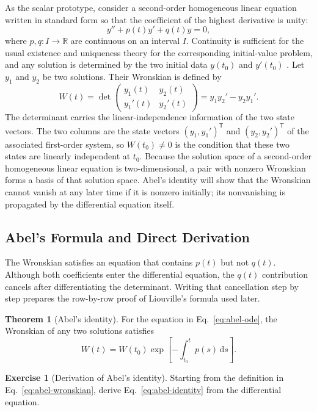 \documentclass[11pt,a4paper]{article}
\newcommand{\be}{\begin{equation}}
\newcommand{\ee}{\end{equation}}
\newcommand{\lb}[1]{\label{#1}}
\newcommand{\dd}{\mathrm{d}}
\newcommand{\R}{\mathbb{R}}
\theoremstyle{definition}
\newtheorem{theorem}{Theorem}[section]
\newtheorem{exercise}{Exercise}[section]
\numberwithin{equation}{section}
\begin{document}
As the scalar prototype, consider a second-order homogeneous linear equation written in standard form so that the coefficient of the highest derivative is unity:
\be
y''+p(t)y'+q(t)y=0,
\lb{eq:abel-ode}
\ee
where $p,q:I\rightarrow\R$ are continuous on an interval $I$. Continuity is sufficient for the usual existence and uniqueness theory for the corresponding initial-value problem, and any solution is determined by the two initial data $y(t_0)$ and $y'(t_0)$ \cite{coddington1955,teschl2012}. Let $y_1$ and $y_2$ be two solutions. Their Wronskian is defined by
\be
W(t)=
\det
\begin{pmatrix}
y_1(t) & y_2(t)\\
y_1'(t) & y_2'(t)
\end{pmatrix}
=
y_1y_2'-y_2y_1'.
\lb{eq:abel-wronskian}
\ee
The determinant carries the linear-independence information of the two state vectors. The two columns are the state vectors $(y_1,y_1')^{\mathsf T}$ and $(y_2,y_2')^{\mathsf T}$ of the associated first-order system, so $W(t_0)\neq0$ is the condition that these two states are linearly independent at $t_0$. Because the solution space of a second-order homogeneous linear equation is two-dimensional, a pair with nonzero Wronskian forms a basis of that solution space. Abel's identity will show that the Wronskian cannot vanish at any later time if it is nonzero initially; its nonvanishing is propagated by the differential equation itself.

\subsection{Abel's Formula and Direct Derivation}

The Wronskian satisfies an equation that contains $p(t)$ but not $q(t)$. Although both coefficients enter the differential equation, the $q(t)$ contribution cancels after differentiating the determinant. Writing that cancellation step by step prepares the row-by-row proof of Liouville's formula used later.

\begin{theorem}[Abel's identity]
For the equation in Eq.~\eqref{eq:abel-ode}, the Wronskian of any two solutions satisfies
\be
W(t)=W(t_0)
\exp\left[-\int_{t_0}^{t}p(s)\,\dd s\right].
\lb{eq:abel-identity}
\ee
\end{theorem}

\begin{exercise}[Derivation of Abel's identity]
Starting from the definition in Eq.~\eqref{eq:abel-wronskian}, derive Eq.~\eqref{eq:abel-identity} from the differential equation.
\end{exercise}
\end{document}
